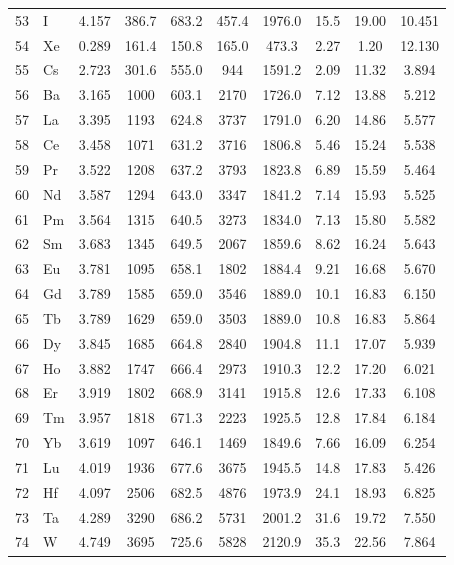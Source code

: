 \documentclass[11pt,a4paper]{article}
\begin{document}
\begin{longtable}{@{}llcccccccc@{}}
		53 & I   & 4.157 & 386.7  & 683.2  & 457.4  & 1976.0 & 15.5  & 19.00 & 10.451 \\
		54 & Xe  & 0.289 & 161.4  & 150.8  & 165.0  & 473.3  & 2.27  & 1.20  & 12.130 \\
		55 & Cs  & 2.723 & 301.6  & 555.0  & 944    & 1591.2 & 2.09  & 11.32 & 3.894 \\
		56 & Ba  & 3.165 & 1000   & 603.1  & 2170   & 1726.0 & 7.12  & 13.88 & 5.212 \\
		57 & La  & 3.395 & 1193   & 624.8  & 3737   & 1791.0 & 6.20  & 14.86 & 5.577 \\
		58 & Ce  & 3.458 & 1071   & 631.2  & 3716   & 1806.8 & 5.46  & 15.24 & 5.538 \\
		59 & Pr  & 3.522 & 1208   & 637.2  & 3793   & 1823.8 & 6.89  & 15.59 & 5.464 \\
		60 & Nd  & 3.587 & 1294   & 643.0  & 3347   & 1841.2 & 7.14  & 15.93 & 5.525 \\
		61 & Pm  & 3.564 & 1315   & 640.5  & 3273   & 1834.0 & 7.13  & 15.80 & 5.582 \\
		62 & Sm  & 3.683 & 1345   & 649.5  & 2067   & 1859.6 & 8.62  & 16.24 & 5.643 \\
		63 & Eu  & 3.781 & 1095   & 658.1  & 1802   & 1884.4 & 9.21  & 16.68 & 5.670 \\
		64 & Gd  & 3.789 & 1585   & 659.0  & 3546   & 1889.0 & 10.1  & 16.83 & 6.150 \\
		65 & Tb  & 3.789 & 1629   & 659.0  & 3503   & 1889.0 & 10.8  & 16.83 & 5.864 \\
		66 & Dy  & 3.845 & 1685   & 664.8  & 2840   & 1904.8 & 11.1  & 17.07 & 5.939 \\
		67 & Ho  & 3.882 & 1747   & 666.4  & 2973   & 1910.3 & 12.2  & 17.20 & 6.021 \\
		68 & Er  & 3.919 & 1802   & 668.9  & 3141   & 1915.8 & 12.6  & 17.33 & 6.108 \\
		69 & Tm  & 3.957 & 1818   & 671.3  & 2223   & 1925.5 & 12.8  & 17.84 & 6.184 \\
		70 & Yb  & 3.619 & 1097   & 646.1  & 1469   & 1849.6 & 7.66  & 16.09 & 6.254 \\
		71 & Lu  & 4.019 & 1936   & 677.6  & 3675   & 1945.5 & 14.8  & 17.83 & 5.426 \\
		72 & Hf  & 4.097 & 2506   & 682.5  & 4876   & 1973.9 & 24.1  & 18.93 & 6.825 \\
		73 & Ta  & 4.289 & 3290   & 686.2  & 5731   & 2001.2 & 31.6  & 19.72 & 7.550 \\
		74 & W   & 4.749 & 3695   & 725.6  & 5828   & 2120.9 & 35.3  & 22.56 & 7.864 \\

\end{longtable}
\end{document}
